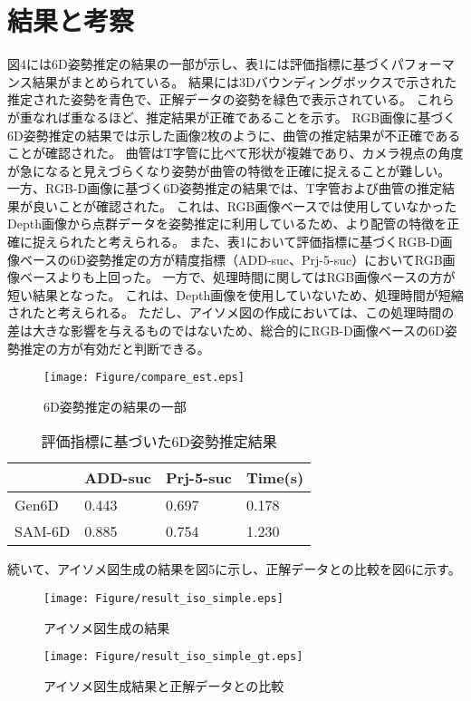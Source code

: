 \section{結果と考察}
図4には6D姿勢推定の結果の一部が示し、表1には評価指標に基づくパフォーマンス結果がまとめられている。
結果には3Dバウンディングボックスで示された推定された姿勢を青色で、正解データの姿勢を緑色で表示されている。
これらが重なれば重なるほど、推定結果が正確であることを示す。
RGB画像に基づく6D姿勢推定の結果では示した画像2枚のように、曲管の推定結果が不正確であることが確認された。
曲管はT字管に比べて形状が複雑であり、カメラ視点の角度が急になると見えづらくなり姿勢が曲管の特徴を正確に捉えることが難しい。
一方、RGB-D画像に基づく6D姿勢推定の結果では、T字管および曲管の推定結果が良いことが確認された。
これは、RGB画像ベースでは使用していなかったDepth画像から点群データを姿勢推定に利用しているため、より配管の特徴を正確に捉えられたと考えられる。
また、表1において評価指標に基づくRGB-D画像ベースの6D姿勢推定の方が精度指標（ADD-suc、Prj-5-suc）においてRGB画像ベースよりも上回った。
一方で、処理時間に関してはRGB画像ベースの方が短い結果となった。
これは、Depth画像を使用していないため、処理時間が短縮されたと考えられる。
ただし、アイソメ図の作成においては、この処理時間の差は大きな影響を与えるものではないため、総合的にRGB-D画像ベースの6D姿勢推定の方が有効だと判断できる。

\begin{figure}[htbt]
	\centering
	\texttt{[image: Figure/compare\_est.eps]}
	\caption{6D姿勢推定の結果の一部}
	\label{fig:f2}
\end{figure}

\begin{table}[h]
	\centering
	\caption{評価指標に基づいた6D姿勢推定結果}
	\begin{tabular}{|p{1.7cm}|p{1.7cm}|p{1.7cm}|p{1.7cm}|}
	\hline
	& ADD-suc & Prj-5-suc & Time(s) \\
	\hline
	Gen6D & 0.443 & 0.697 & 0.178 \\
	\hline
	SAM-6D & 0.885 & 0.754 & 1.230 \\
	\hline
	\end{tabular}
\end{table}

続いて、アイソメ図生成の結果を図5に示し、正解データとの比較を図6に示す。

\begin{figure}[htbt]
	\centering
	\texttt{[image: Figure/result\_iso\_simple.eps]}
	\caption{アイソメ図生成の結果}
	\label{fig:f2}
\end{figure}
\begin{figure}[htbt]
	\centering
	\texttt{[image: Figure/result\_iso\_simple\_gt.eps]}
	\caption{アイソメ図生成結果と正解データとの比較}
	\label{fig:f2}
\end{figure}

